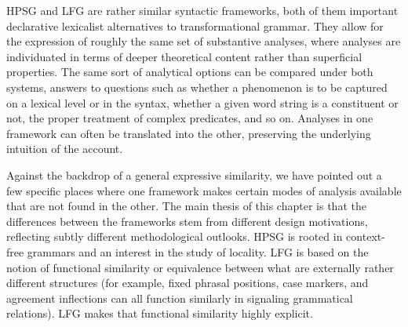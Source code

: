 HPSG and LFG  are rather similar syntactic frameworks, both of them important declarative lexicalist alternatives to transformational grammar.  They allow for the expression of roughly the same set of substantive analyses, where analyses are individuated in terms of deeper theoretical content rather than superficial properties.  The same sort of analytical options can be compared under both systems, answers to questions such as whether a phenomenon is to be captured on a lexical level or in the syntax, whether a given word string is a constituent or not, the proper treatment of complex predicates, and so on.   Analyses in one framework can often be translated into the other, preserving the underlying intuition of the account.   %

Against the backdrop of a general expressive similarity, we have pointed out a few specific places where one framework makes certain modes of analysis available that are not found in the other.   The main thesis of this chapter is that the differences between the frameworks stem from different design motivations, reflecting subtly different methodological outlooks.  HPSG is rooted in context-free grammars and an interest in the study of locality.  LFG is based on the notion of functional similarity or equivalence between what are externally rather different structures (for example, fixed phrasal positions, case markers, and agreement inflections can all function similarly in signaling grammatical relations).  LFG makes that functional similarity highly explicit.
 

\printbibliography[heading=subbibliography,notkeyword=this] 
%

\let\upashtmp\up

